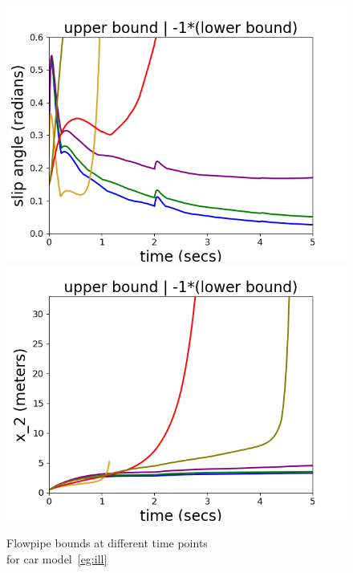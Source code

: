 \begin{figure}
\includegraphics[scale = 0.41]{autocarImages/ubToolSlip.png}\hspace{-2.2em}
\includegraphics[scale = 0.41]{autocarImages/ubToolx2.png}
  \caption{Flowpipe bounds at different time points\\ for
    car model~\ref{eg:ill}}\label{fig:flowcar}
\end{figure}
%
